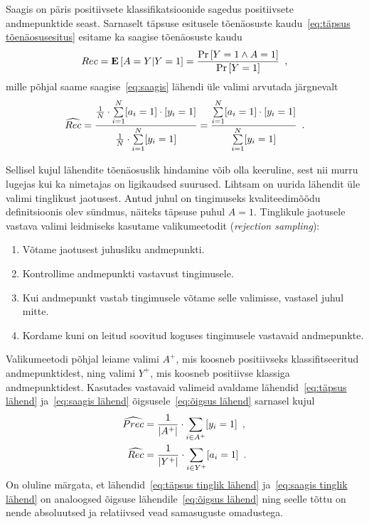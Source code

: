 Saagis on päris positiivsete klassifikatsioonide sagedus positiivsete andmepunktide seast. Sarnaselt täpsuse esitusele tõenäosuste kaudu~\eqref{eq:täpsus tõenäosusesitus} esitame ka saagise tõenäosuste kaudu
\begin{equation*}
    Rec = \operatorname*{\mathbf{E}}\left[A = Y | Y = 1\right] = \frac{\Pr\left[Y = 1 \land A = 1\right]}{\Pr\left[Y = 1\right]} \enspace,
\end{equation*}
mille põhjal saame saagise~\eqref{eq:saagis} lähendi üle valimi arvutada järgnevalt
\begin{equation}
    \label{eq:saagis lähend}
    \widehat{Rec} = \frac{\frac{1}{N} \cdot \sum \limits_{i = 1}^{N} [a_i = 1] \cdot [y_i = 1]}{\frac{1}{N} \cdot \sum \limits_{i = 1}^{N} [y_i = 1]} = \frac{\sum \limits_{i = 1}^{N} [a_i = 1] \cdot [y_i = 1]}{\sum \limits_{i = 1}^{N} [y_i = 1]} \enspace.
\end{equation}

Sellisel kujul lähendite tõenäosuslik hindamine võib olla keeruline, sest nii murru lugejas kui ka nimetajas on ligikaudsed suurused. Lihtsam on uurida lähendit üle valimi tinglikust jaotusest. Antud juhul on tingimuseks kvaliteedimõõdu definitsioonis olev sündmus, näiteks täpsuse puhul $A = 1$. Tinglikule jaotusele vastava valimi leidmiseks kasutame valikumeetodit (\emph{rejection sampling}):
\begin{enumerate}
    \item Võtame jaotusest juhusliku andmepunkti.
    \item Kontrollime andmepunkti vastavust tingimusele.
    \item Kui andmepunkt vastab tingimusele võtame selle valimisse, vastasel juhul mitte.
    \item Kordame kuni on leitud soovitud koguses tingimusele vastavaid andmepunkte.
\end{enumerate}

Valikumeetodi põhjal leiame valimi $A^{+}$, mis koosneb positiivseks klassifitseeritud andmepunktidest, ning valimi $Y^{+}$, mis koosneb positiivse klassiga andmepunktidest. Kasutades vastavaid valimeid avaldame lähendid~\eqref{eq:täpsus lähend} ja~\eqref{eq:saagis lähend} õigsusele~\eqref{eq:õigsus lähend} sarnasel kujul
\begin{align}
    \widehat{Prec} &= \frac{1}{| A^{+} |} \cdot \sum_{i \in A^{+}} [y_i = 1] \enspace, \label{eq:täpsus tinglik lähend}\\
    \widehat{Rec} &= \frac{1}{|Y^{+}|} \cdot \sum_{i \in Y^{+}} [a_i = 1] \label{eq:saagis tinglik lähend}\enspace.
\end{align}
On oluline märgata, et lähendid~\eqref{eq:täpsus tinglik lähend} ja~\eqref{eq:saagis tinglik lähend} on analoogsed õigsuse lähendile~\eqref{eq:õigsus lähend} ning seelle tõttu on nende absoluutsed ja relatiivsed vead samasuguste omadustega.


